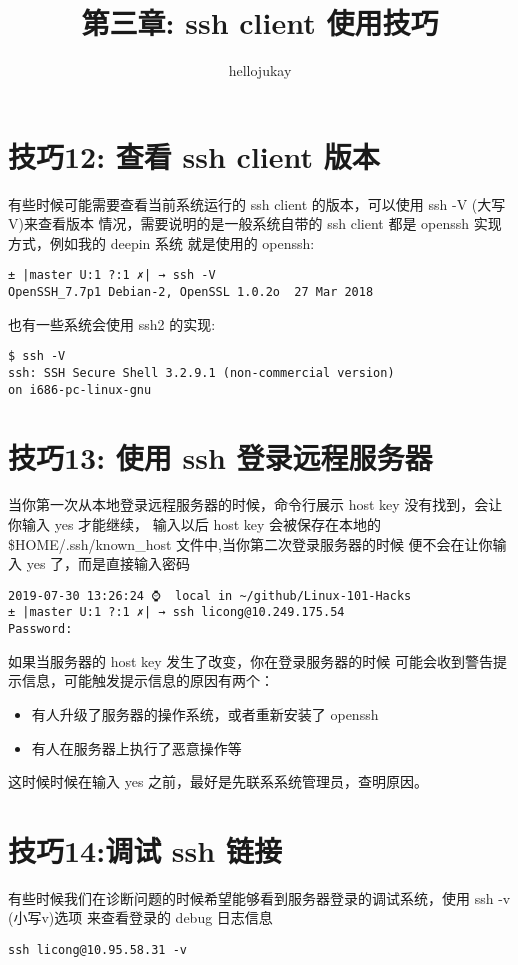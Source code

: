 \documentclass[UTF8]{ctexart}
\title{第三章: ssh client 使用技巧}
\author{hellojukay}
\begin{document}
\section*{技巧12: 查看 ssh client 版本}
有些时候可能需要查看当前系统运行的 ssh client 的版本，可以使用 ssh -V (大写V)来查看版本
情况，需要说明的是一般系统自带的 ssh client 都是 openssh 实现方式，例如我的 deepin 系统
就是使用的 openssh:
\begin{lstlisting}
± |master U:1 ?:1 ✗| → ssh -V
OpenSSH_7.7p1 Debian-2, OpenSSL 1.0.2o  27 Mar 2018
\end{lstlisting}
也有一些系统会使用 ssh2 的实现:
\begin{lstlisting}
$ ssh -V
ssh: SSH Secure Shell 3.2.9.1 (non-commercial version)
on i686-pc-linux-gnu
\end{lstlisting}


\section*{技巧13: 使用 ssh 登录远程服务器}
当你第一次从本地登录远程服务器的时候，命令行展示 host key 没有找到，会让你输入 yes 才能继续，
输入以后 host key 会被保存在本地的 \$HOME/.ssh/known\_host 文件中,当你第二次登录服务器的时候
便不会在让你输入 yes 了，而是直接输入密码
\begin{lstlisting}
2019-07-30 13:26:24 ⌚  local in ~/github/Linux-101-Hacks
± |master U:1 ?:1 ✗| → ssh licong@10.249.175.54
Password:
\end{lstlisting}
如果当服务器的 host key 发生了改变，你在登录服务器的时候
可能会收到警告提示信息，可能触发提示信息的原因有两个：
\begin{itemize}
    \item 有人升级了服务器的操作系统，或者重新安装了 openssh
    \item 有人在服务器上执行了恶意操作等
\end{itemize}
这时候时候在输入 yes 之前，最好是先联系系统管理员，查明原因。


\section*{技巧14:调试 ssh 链接}
有些时候我们在诊断问题的时候希望能够看到服务器登录的调试系统，使用 ssh -v (小写v)选项
来查看登录的 debug 日志信息
\begin{lstlisting}
ssh licong@10.95.58.31 -v 
\end{lstlisting}
\end{document}

